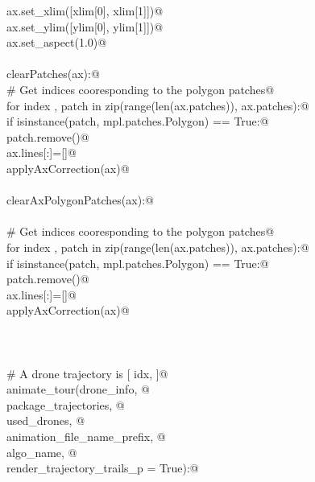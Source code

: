 \documentclass[10.0pt]{report}
\begin{document}
\begin{appendices}
\begin{flushleft}
\begin{list}{}{}
\mbox{}\verb@      ax.set_xlim([xlim[0], xlim[1]])@\\
\mbox{}\verb@      ax.set_ylim([ylim[0], ylim[1]])@\\
\mbox{}\verb@      ax.set_aspect(1.0)@\\
\mbox{}\verb@@\\
\mbox{}\verb@def clearPatches(ax):@\\
\mbox{}\verb@    # Get indices cooresponding to the polygon patches@\\
\mbox{}\verb@    for index , patch in zip(range(len(ax.patches)), ax.patches):@\\
\mbox{}\verb@        if isinstance(patch, mpl.patches.Polygon) == True:@\\
\mbox{}\verb@            patch.remove()@\\
\mbox{}\verb@    ax.lines[:]=[]@\\
\mbox{}\verb@    applyAxCorrection(ax)@\\
\mbox{}\verb@@\\
\mbox{}\verb@def clearAxPolygonPatches(ax):@\\
\mbox{}\verb@@\\
\mbox{}\verb@    # Get indices cooresponding to the polygon patches@\\
\mbox{}\verb@    for index , patch in zip(range(len(ax.patches)), ax.patches):@\\
\mbox{}\verb@        if isinstance(patch, mpl.patches.Polygon) == True:@\\
\mbox{}\verb@            patch.remove()@\\
\mbox{}\verb@    ax.lines[:]=[]@\\
\mbox{}\verb@    applyAxCorrection(ax)@\\
\mbox{}\verb@@\\
\mbox{}\verb@@\\
\mbox{}\verb@@\\
\mbox{}\verb@# A drone trajectory is [ idx,      ]@\\
\mbox{}\verb@def animate_tour(drone_info, @\\
\mbox{}\verb@                 package_trajectories, @\\
\mbox{}\verb@                 used_drones, @\\
\mbox{}\verb@                 animation_file_name_prefix, @\\
\mbox{}\verb@                 algo_name,  @\\
\mbox{}\verb@                 render_trajectory_trails_p = True):@\\

\end{list}
\end{flushleft}
\end{appendices}
\end{document}
